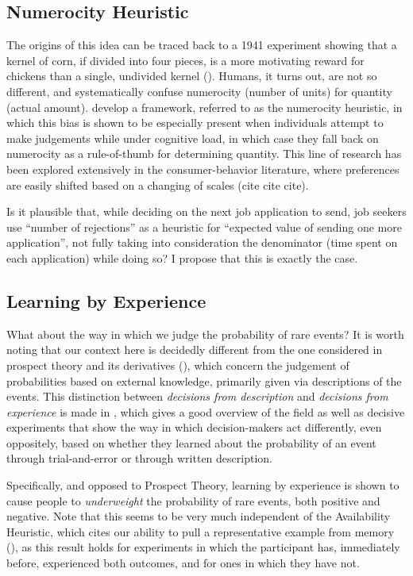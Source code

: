 \documentclass[a4paper,12pt]{article}
\begin{document}
\subsection{Numerocity Heuristic}

The origins of this idea can be traced back to a 1941 experiment showing that a kernel of corn, if divided into four pieces, is a more motivating reward for chickens than a single, undivided kernel (\cite{wolfe1941}). Humans, it turns out, are not so different, and systematically confuse numerocity (number of units) for quantity (actual amount). \cite{pelham1994} develop a framework, referred to as the numerocity heuristic, in which this bias is shown to be especially present when individuals attempt to make judgements while under cognitive load, in which case they fall back on numerocity as a rule-of-thumb for determining quantity. This line of research has been explored extensively in the consumer-behavior literature, where preferences are easily shifted based on a changing of scales (cite cite cite).

Is it plausible that, while deciding on the next job application to send, job seekers use ``number of rejections'' as a heuristic for ``expected value of sending one more application'', not fully taking into consideration the denominator (time spent on each application) while doing so? I propose that this is exactly the case.

\subsection{Learning by Experience}

What about the way in which we judge the probability of rare events? It is worth noting that our context here is decidedly different from the one considered in prospect theory and its derivatives (\cite{kahneman1979}), which concern the judgement of probabilities based on external knowledge, primarily given via descriptions of the events. This distinction between \textit{decisions from description} and \textit{decisions from experience} is made in \cite{hertwig2004}, which gives a good overview of the field as well as decisive experiments that show the way in which decision-makers act differently, even oppositely, based on whether they learned about the probability of an event through trial-and-error or through written description.

Specifically, and opposed to Prospect Theory, learning by experience is shown to cause people to \textit{underweight} the probability of rare events, both positive and negative. Note that this seems to be very much independent of the Availability Heuristic, which cites our ability to pull a representative example from memory (\cite{tversky1973}), as this result holds for experiments in which the participant has, immediately before, experienced both outcomes, and for ones in which they have not.
\end{document}
